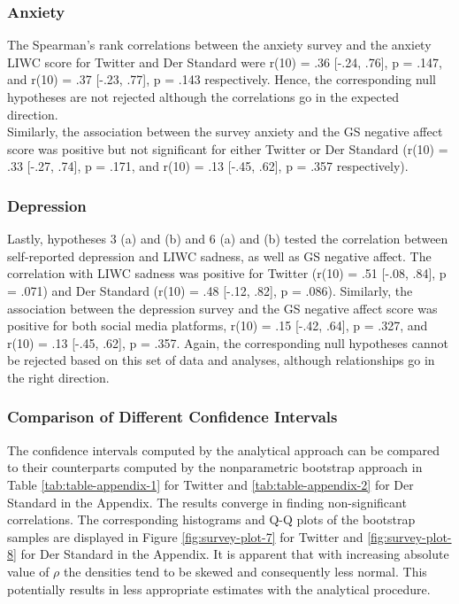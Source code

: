 \documentclass[
  english,
  jou,floatsintext]{apa7}
\begin{document}
\hypertarget{anxiety}{%
\subsubsection{Anxiety}\label{anxiety}}

The Spearman's rank correlations between the anxiety survey and the anxiety LIWC score for Twitter and Der Standard were r(10) = .36 {[}-.24, .76{]}, p = .147, and r(10) = .37 {[}-.23, .77{]}, p = .143 respectively. Hence, the corresponding null hypotheses are not rejected although the correlations go in the expected direction.\\
Similarly, the association between the survey anxiety and the GS negative affect score was positive but not significant for either Twitter or Der Standard (r(10) = .33 {[}-.27, .74{]}, p = .171, and r(10) = .13 {[}-.45, .62{]}, p = .357 respectively).

\hypertarget{depression}{%
\subsubsection{Depression}\label{depression}}

Lastly, hypotheses 3 (a) and (b) and 6 (a) and (b) tested the correlation between self-reported depression and LIWC sadness, as well as GS negative affect. The correlation with LIWC sadness was positive for Twitter (r(10) = .51 {[}-.08, .84{]}, p = .071) and Der Standard (r(10) = .48 {[}-.12, .82{]}, p = .086). Similarly, the association between the depression survey and the GS negative affect score was positive for both social media platforms, r(10) = .15 {[}-.42, .64{]}, p = .327, and r(10) = .13 {[}-.45, .62{]}, p = .357. Again, the corresponding null hypotheses cannot be rejected based on this set of data and analyses, although relationships go in the right direction.

\hypertarget{comparison-of-different-confidence-intervals}{%
\subsubsection{Comparison of Different Confidence Intervals}\label{comparison-of-different-confidence-intervals}}

The confidence intervals computed by the analytical approach can be compared to their counterparts computed by the nonparametric bootstrap approach in Table \ref{tab:table-appendix-1} for Twitter and \ref{tab:table-appendix-2} for Der Standard in the Appendix. The results converge in finding non-significant correlations. The corresponding histograms and Q-Q plots of the bootstrap samples are displayed in Figure \ref{fig:survey-plot-7} for Twitter and \ref{fig:survey-plot-8} for Der Standard in the Appendix. It is apparent that with increasing absolute value of \(\rho\) the densities tend to be skewed and consequently less normal. This potentially results in less appropriate estimates with the analytical procedure.
\end{document}

